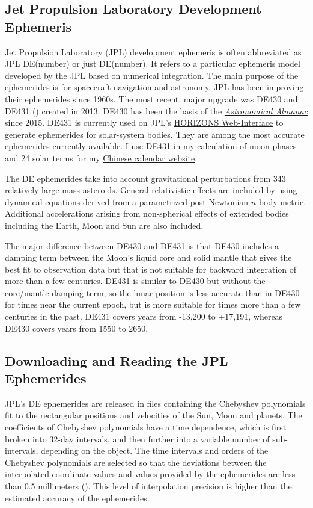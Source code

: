 \documentclass[12pt]{article}
\begin{document}
\begin{CJK}{UTF8}{bkai}
\section{Jet Propulsion Laboratory Development Ephemeris}
\label{sec:jpleph}

Jet Propulsion Laboratory (JPL) development ephemeris is often 
abbreviated as JPL DE(number) or just DE(number). It refers to a particular 
ephemeris model developed by the JPL based on numerical integration. 
The main purpose of the ephemerides is for spacecraft navigation and astronomy. 
JPL has been improving their ephemerides since 1960s. The most recent, major 
upgrade was DE430 and DE431 (\cite{folkner14})
created in 2013. DE430 has been the basis of the 
\href{https://en.wikipedia.org/wiki/Astronomical_Almanac}{\it Astronomical Almanac} 
since 2015. DE431 is currently used on JPL's \href{https://ssd.jpl.nasa.gov/horizons.cgi}
{HORIZONS Web-Interface} to generate ephemerides for solar-system bodies. 
They are among the most accurate ephemerides currently available. 
I use DE431 in my calculation of moon phases and 24 solar terms for my 
\href{../calendar.html}{Chinese calendar website}. 

The DE ephemerides take into account gravitational perturbations from 
343 relatively large-mass asteroids. General relativistic effects are 
included by using dynamical equations derived from a parametrized 
post-Newtonian $n$-body metric. Additional accelerations arising 
from non-spherical effects of extended bodies including the Earth, 
Moon and Sun are also included. 

The major difference between DE430 and DE431 is that DE430 includes 
a damping term between the Moon's liquid core and solid mantle that 
gives the best fit to observation data but that is not 
suitable for backward integration of more than a few centuries. 
DE431 is similar to DE430 but without the 
core/mantle damping term, so the lunar position is less accurate than 
in DE430 for times near the current epoch, but is more suitable 
for times more than a few centuries in the past. DE431 covers 
years from -13,200 to +17,191, whereas DE430 covers years from 
1550 to 2650.

\subsection{Downloading and Reading the JPL Ephemerides}

JPL's DE ephemerides are released in files containing the 
Chebyshev polynomials fit to the rectangular positions and velocities of the 
Sun, Moon and planets. 
The coefficients of Chebyshev polynomials have a time dependence, which is first broken into
32-day intervals, and then further into a variable number of
sub-intervals, depending on the object.
The time intervals and 
orders of the Chebyshev polynomials are 
selected so that the deviations between the interpolated coordinate values 
and values provided by the ephemerides are less than 0.5 
millimeters (\cite{newhall89}). This level of interpolation 
precision is higher than the estimated accuracy of the ephemerides. 


\end{CJK}
\end{document}
